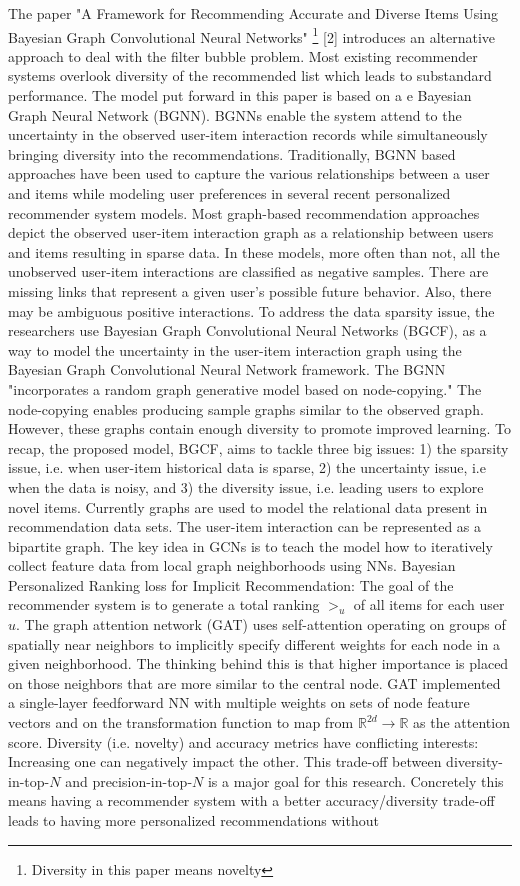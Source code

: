 The paper "A Framework for Recommending Accurate and Diverse Items  Using Bayesian Graph Convolutional Neural Networks" \footnote {Diversity in this paper means novelty} [2] introduces an alternative approach to deal with the filter bubble problem. Most existing recommender systems overlook diversity of the recommended list which leads to substandard performance. The model put forward in this paper is based on a e Bayesian Graph Neural Network (BGNN). BGNNs enable the system attend to the uncertainty in the observed user-item interaction records while simultaneously bringing diversity into the recommendations.  Traditionally, BGNN based approaches have been used to capture the various relationships between a user and items while modeling user preferences in several recent personalized recommender system models. Most graph-based recommendation approaches depict the observed user-item interaction graph as a relationship between users and items resulting in sparse data. In these models, more often than not, all the unobserved user-item interactions are classified as negative samples. There are missing links that represent a given user’s possible future behavior. Also, there may be ambiguous positive interactions. To address the data sparsity issue, the researchers use Bayesian Graph Convolutional Neural Networks (BGCF), as a way to model the uncertainty in the user-item interaction graph using the Bayesian Graph Convolutional Neural Network framework. The BGNN "incorporates a random graph generative model based on node-copying." The node-copying enables producing sample graphs similar to the observed graph. However, these graphs contain enough diversity to promote improved learning. To recap, the proposed model, BGCF, aims to tackle three big issues: 1) the sparsity issue, i.e. when user-item historical data is sparse, 2) the uncertainty issue, i.e when the data is noisy, and 3) the diversity issue, i.e. leading users to explore novel items. Currently graphs are used to model the relational data present in recommendation data sets. The user-item interaction can be represented as a bipartite graph.  The key idea in GCNs is to teach the model how to iteratively collect feature data from local graph neighborhoods using NNs.  Bayesian Personalized Ranking loss for Implicit Recommendation: The goal of the recommender system is to generate a total ranking $>_u$ of all items for each user $u$. The graph attention network (GAT) uses self-attention operating on groups of spatially near neighbors to implicitly specify different weights for each node in a given neighborhood. The thinking behind this is that higher importance is placed on those neighbors that are more similar to the central node. GAT implemented a single-layer feedforward NN with multiple weights on sets of node feature vectors and on the transformation function to map from $\mathbb{R}^{2d}\longrightarrow\mathbb{R} $  as the attention score. Diversity (i.e. novelty) and accuracy metrics have conflicting interests: Increasing one can negatively impact the other. This trade-off between diversity- in-top-$N$ and precision-in-top-$N$ is a major goal for this research. Concretely this means having a recommender system with a better accuracy/diversity trade-off leads to having more personalized recommendations without 